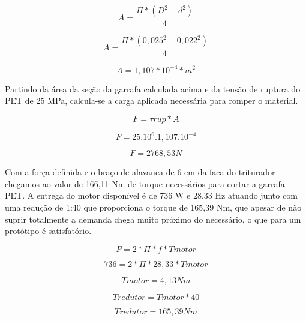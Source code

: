 \begin{equation}
    A = \frac{\Pi \ast (D^{2}- d^{2})}{4}
\end{equation}

\begin{equation}
    A = \frac{\Pi \ast (0,025^{2}- 0,022^{2})}{4}
\end{equation}

\begin{equation}
    A = 1,107 \ast 10^{-4} \ast m^{2}
\end{equation}

Partindo da área da seção da garrafa calculada acima e da tensão de ruptura do PET de 25 MPa, calcula-se a carga aplicada necessária para romper o material.

\begin{equation}
    F = \tau rup \ast A
\end{equation}

\begin{equation}
    F = 25.10^{6}. 1,107.10^{-4}
\end{equation}

\begin{equation}
    F = 2768,53 N
\end{equation}

Com a força definida e o braço de alavanca de 6 cm da faca do triturador chegamos ao valor de 166,11 Nm de torque necessários para cortar a garrafa PET. A entrega do motor disponível é de 736 W e 28,33 Hz atuando junto com uma redução de 1:40 que proporciona o torque de 165,39 Nm, que apesar de não suprir totalmente a demanda chega muito próximo do necessário, o que para um protótipo é satisfatório.

\begin{equation}
    P = 2 \ast \Pi \ast f \ast Tmotor
\end{equation}

\begin{equation}
    736 = 2 \ast \Pi \ast 28,33 \ast Tmotor
\end{equation}

\begin{equation}
    Tmotor = 4,13 Nm
\end{equation}

\begin{equation}
    Tredutor = Tmotor \ast 40
\end{equation}

\begin{equation}
    Tredutor = 165,39 Nm
\end{equation}

